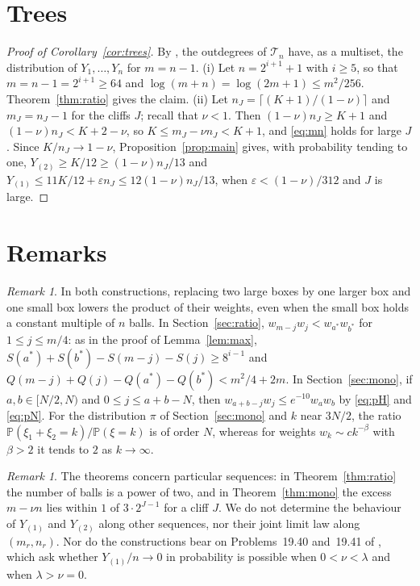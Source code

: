 \documentclass[11pt]{amsart}
\theoremstyle{remark}
\newtheorem{remark}[theorem]{Remark}
\numberwithin{equation}{section}
\newcommand{\Pp}{\mathbb P}
\newcommand{\cT}{\mathcal T}
\begin{document}
\section{Trees}\label{sec:trees}

\begin{proof}[Proof of Corollary~\ref{cor:trees}]
By \cite[Lemma~17.1]{J12}, the outdegrees of $\cT_n$ have, as a multiset, the distribution of $Y_1,\dots,Y_n$ for $m=n-1$. (i) Let $n=2^{i+1}+1$ with $i\ge5$, so that $m=n-1=2^{i+1}\ge64$ and $\log(m+n)=\log(2m+1)\le m^2/256$. Theorem~\ref{thm:ratio} gives the claim. (ii) Let $n_J=\lceil(K+1)/(1-\nu)\rceil$ and $m_J=n_J-1$ for the cliffs $J$; recall that $\nu<1$. Then $(1-\nu)n_J\ge K+1$ and $(1-\nu)n_J<K+2-\nu$, so $K\le m_J-\nu n_J<K+1$, and \eqref{eq:mn} holds for large $J$. Since $K/n_J\to1-\nu$, Proposition~\ref{prop:main} gives, with probability tending to one, $Y_{(2)}\ge K/12\ge(1-\nu)n_J/13$ and $Y_{(1)}\le11K/12+\varepsilon n_J\le12(1-\nu)n_J/13$, when $\varepsilon<(1-\nu)/312$ and $J$ is large.
\end{proof}

\section{Remarks}\label{sec:remarks}

\begin{remark}\label{rem:exchange}
In both constructions, replacing two large boxes by one larger box and one small box lowers the product of their weights, even when the small box holds a constant multiple of $n$ balls. In Section~\ref{sec:ratio}, $w_{m-j}w_j<w_{a^*}w_{b^*}$ for $1\le j\le m/4$: as in the proof of Lemma~\ref{lem:max}, $S(a^*)+S(b^*)-S(m-j)-S(j)\ge8^{i-1}$ and $Q(m-j)+Q(j)-Q(a^*)-Q(b^*)<m^2/4+2m$. In Section~\ref{sec:mono}, if $a,b\in[N/2,N)$ and $0\le j\le a+b-N$, then $w_{a+b-j}w_j\le e^{-10}w_aw_b$ by \eqref{eq:pH} and \eqref{eq:pN}. For the distribution $\pi$ of Section~\ref{sec:mono} and $k$ near $3N/2$, the ratio $\Pp(\xi_1+\xi_2=k)/\Pp(\xi=k)$ is of order $N$, whereas for weights $w_k\sim ck^{-\beta}$ with $\beta>2$ it tends to $2$ as $k\to\infty$.
\end{remark}

\begin{remark}\label{rem:scope}
The theorems concern particular sequences: in Theorem~\ref{thm:ratio} the number of balls is a power of two, and in Theorem~\ref{thm:mono} the excess $m-\nu n$ lies within $1$ of $3\cdot2^{J-1}$ for a cliff $J$. We do not determine the behaviour of $Y_{(1)}$ and $Y_{(2)}$ along other sequences, nor their joint limit law along $(m_r,n_r)$. Nor do the constructions bear on Problems~19.40 and~19.41 of \cite{J12}, which ask whether $Y_{(1)}/n\to0$ in probability is possible when $0<\nu<\lambda$ and when $\lambda>\nu=0$.
\end{remark}
\end{document}
